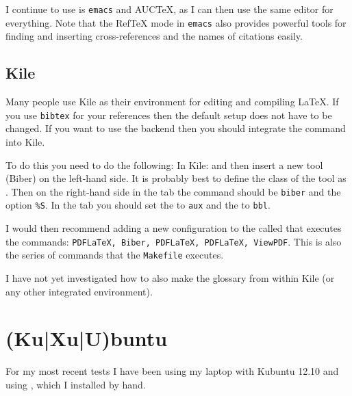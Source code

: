 I continue to use is \texttt{emacs} and AUCTeX, as I can
then use the same editor for everything. Note that the
RefTeX mode in \texttt{emacs} also provides powerful
tools for finding and inserting cross-references and the names of
citations easily.


\subsection{Kile}
\label{sec:app:kubuntu:kile}

Many people use Kile as their environment for editing and compiling
\LaTeX. If you use \texttt{bibtex} for your references then the default
setup does not have to be changed. If you want to use the
 backend then you should integrate the
command into Kile.

To do this you need to do the following:
In Kile:  and
then insert a new tool (Biber) on the left-hand side. It is probably
best to define the class of the tool as \BibTeX. Then on the
right-hand side in the  tab the command should be
\texttt{biber} and the option \texttt{\%S}. In the 
tab you should set the  to \texttt{aux} and
the  to \texttt{bbl}.

I would then recommend adding a new configuration to the
 called  that
executes the commands: \texttt{PDFLaTeX, Biber, PDFLaTeX, PDFLaTeX,
  ViewPDF}. This is also the series of commands that the
\texttt{Makefile} executes.

I have not yet investigated how to also make the glossary from within
Kile (or any other integrated environment).


\section{(Ku|Xu|U)buntu}
\label{sec:app:kubuntu}

For my most recent tests I have been using my laptop with Kubuntu 12.10
and using , which I installed by hand.

